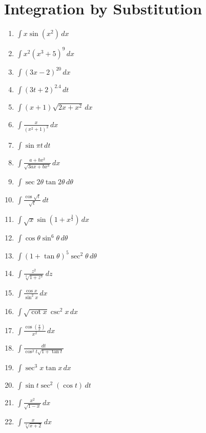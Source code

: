 \documentclass[12pt]{article}
\newcommand{\mins}{-}
\newcommand{\inline}[1]{\({#1}\)}
\begin{document}
\newpage\section{Integration by Substitution}
    \begin{enumerate}
        \item \inline{\int{} x \sin{(x^2)} \, dx}
        \item \inline{\int{} x^2 {(x^3 + 5)}^9 \, dx}
        \item \inline{\int{} {(3x \mins{} 2)}^{20} \, dx}
        \item \inline{\int{} {(3t + 2)}^{2.4} \, dt}
        \item \inline{\int{} (x + 1) \sqrt{2x + x^2} \, dx}
        \item \inline{\int{} \frac{x}{{({x^2 + 1})}^2} \, dx}
        \item \inline{\int{} \sin{\pi{} t} \, dt}
        \item \inline{\int{} \frac{a + bx^2}{\sqrt{3ax + bx^3}} \, dx}
        \item \inline{\int{} \sec{2\theta{}} \tan{2\theta{}} \, d\theta}
        \item \inline{\int{} \frac{\cos{\sqrt{t}}}{\sqrt{t}} \, dt}
        \item \inline{\int{} \sqrt{x} \sin{(1 + x^{\frac{3}{2}})} \, dx}
        \item \inline{\int{} \cos{\theta{}} \sin^6{\theta{}} \, d\theta{}}
        \item \inline{\int{} {(1 + \tan{\theta})}^5 \sec^2{\theta{}} \, d\theta{}}
        \item \inline{\int{} \frac{z^2}{\sqrt[3]{1 + z^3}} \, dz}
        \item \inline{\int{} \frac{\cos{x}}{\sin^2{x}} \, dx}
        \item \inline{\int{} \sqrt{\cot{x}} \csc^2{x} \, dx}
        \item \inline{\int{} \frac{\cos{(\frac{\pi{}}{x})}}{x^2} \, dx}
        \item \inline{\int{} \frac{dt}{\cos^2{t} \sqrt{1 + \tan{t}}}}
        \item \inline{\int{} \sec^3{x} \tan{x} \, dx}
        \item \inline{\int{} \sin{t} \sec^2{(\cos{t})} \, dt}
        \item \inline{\int{} \frac{x^2}{\sqrt{1 \mins{} x}} \, dx}
        \item \inline{\int{} \frac{x}{\sqrt[4]{x + 2}} \, dx}
    \end{enumerate}
\end{document}
